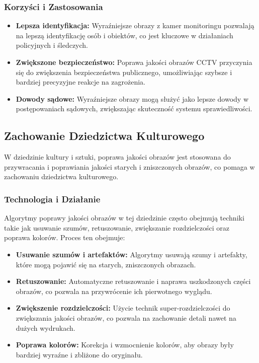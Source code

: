 \documentclass[10pt]{article}
\begin{document}
\subsubsection*{Korzyści i Zastosowania}

\begin{itemize}
    \item \textbf{Lepsza identyfikacja:} Wyraźniejsze obrazy z kamer monitoringu pozwalają na lepszą identyfikację osób i obiektów, co jest kluczowe w działaniach policyjnych i śledczych.
    \item \textbf{Zwiększone bezpieczeństwo:} Poprawa jakości obrazów CCTV przyczynia się do zwiększenia bezpieczeństwa publicznego, umożliwiając szybsze i bardziej precyzyjne reakcje na zagrożenia.
    \item \textbf{Dowody sądowe:} Wyraźniejsze obrazy mogą służyć jako lepsze dowody w postępowaniach sądowych, zwiększając skuteczność systemu sprawiedliwości.
\end{itemize}

\subsection*{Zachowanie Dziedzictwa Kulturowego}

W dziedzinie kultury i sztuki, poprawa jakości obrazów jest stosowana do przywracania i poprawiania jakości starych i zniszczonych obrazów, co pomaga w zachowaniu dziedzictwa kulturowego.

\subsubsection*{Technologia i Działanie}

Algorytmy poprawy jakości obrazów w tej dziedzinie często obejmują techniki takie jak usuwanie szumów, retuszowanie, zwiększanie rozdzielczości oraz poprawa kolorów. Proces ten obejmuje:

\begin{itemize}
    \item \textbf{Usuwanie szumów i artefaktów:} Algorytmy usuwają szumy i artefakty, które mogą pojawić się na starych, zniszczonych obrazach.
    \item \textbf{Retuszowanie:} Automatyczne retuszowanie i naprawa uszkodzonych części obrazów, co pozwala na przywrócenie ich pierwotnego wyglądu.
    \item \textbf{Zwiększenie rozdzielczości:} Użycie technik super-rozdzielczości do zwiększania jakości obrazów, co pozwala na zachowanie detali nawet na dużych wydrukach.
    \item \textbf{Poprawa kolorów:} Korekcja i wzmocnienie kolorów, aby obrazy były bardziej wyraźne i zbliżone do oryginału.
\end{itemize}
\end{document}
